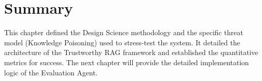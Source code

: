 \section{Summary}
This chapter defined the Design Science methodology and the specific threat model (Knowledge Poisoning) used to stress-test the system. It detailed the architecture of the Trustworthy RAG framework and established the quantitative metrics for success. The next chapter will provide the detailed implementation logic of the Evaluation Agent.
